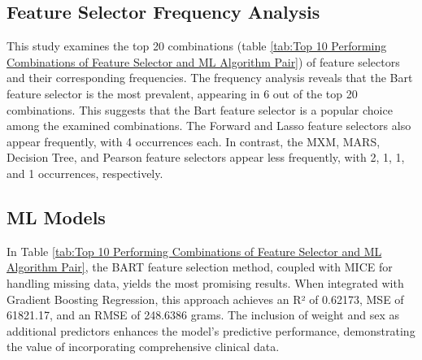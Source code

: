 \documentclass[12pt]{article}
\begin{document}
\subsection{Feature Selector Frequency Analysis}

This study examines the top 20 combinations (table \ref{tab:Top 10 Performing Combinations of Feature Selector and ML Algorithm Pair}) of feature selectors and their corresponding frequencies. The frequency analysis reveals that the Bart feature selector is the most prevalent, appearing in 6 out of the top 20 combinations. This suggests that the Bart feature selector is a popular choice among the examined combinations. The Forward and Lasso feature selectors also appear frequently, with 4 occurrences each. In contrast, the MXM, MARS, Decision Tree, and Pearson feature selectors appear less frequently, with 2, 1, 1, and 1 occurrences, respectively.

\subsection{ML Models}
In Table \ref{tab:Top 10 Performing Combinations of Feature Selector and ML Algorithm Pair}, the BART feature selection method, coupled with MICE for handling missing data, yields the most promising results. When integrated with Gradient Boosting Regression, this approach achieves an R² of 0.62173, MSE of 61821.17, and an RMSE of 248.6386 grams. The inclusion of weight and sex as additional predictors enhances the model's predictive performance, demonstrating the value of incorporating comprehensive clinical data. 

\end{document}
